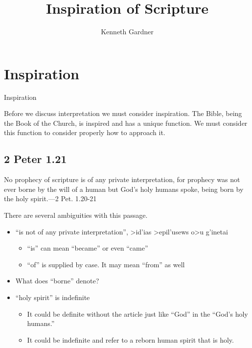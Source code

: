 \documentclass{beamer}
\title{Inspiration of Scripture}
\author{Kenneth Gardner}
\begin{document}
\maketitle

\section{Inspiration}

\begin{frame}
  \huge{Inspiration}
\end{frame}

\begin{frame}
  Before we discuss interpretation we must consider inspiration.
  The Bible, being the Book of the Church, is inspired and has a unique function.
  We must consider this function to consider properly how to approach it.
\end{frame}

\subsection{2 Peter 1.21}

\begin{frame}
  No prophecy of scripture is of any private interpretation, for prophecy was not ever borne by the will of a human but God's holy humans spoke, being born by the holy spirit.---2 Pet. 1.20-21
\end{frame}

\begin{frame}
  There are several ambiguities with this passage.\pause
  \begin{itemize}
	\item ``is not of any private interpretation'', \textgreek{>id'ias >epil'usews o>u g'inetai}\pause
	  \begin{itemize}
		\item ``is'' can mean ``became'' or even ``came''\pause
		\item ``of'' is supplied by case. It may mean ``from'' as well\pause
	  \end{itemize}
	\item What does ``borne'' denote?\pause
	\item ``holy spirit'' is indefinite\pause
	  \begin{itemize}
		\item It could be definite without the article just like ``God'' in the ``God's holy humans.''\pause
		\item It could be indefinite and refer to a reborn human spirit that is holy.
	  \end{itemize}
  \end{itemize}
\end{frame}
\end{document}
